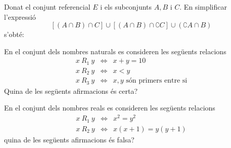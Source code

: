 \begin{enumerate}
\pregunta Donat el conjunt referencial $E$ i els subconjunts $A,B$ i $C$. En
simplificar l'expressió%
\begin{equation*}
\left[ (A\cap B)\cap C\right] \cup\left[ (A\cap B)\cap\complement C\right]
\cup\left( \complement A\cap B\right)
\end{equation*}
s'obté:

\begin{enumerate}
\end{enumerate}
\feedback

\pregunta En el conjunt dels nombres naturals es consideren les següents
relacions%
\begin{equation*}
\begin{array}{lll}
x~R_{1}~y & \Longleftrightarrow & x+y=10 \\
x~R_{2}~y & \Longleftrightarrow & x<y \\
x~R_{3}~y & \Longleftrightarrow & x,y\text{ són primers entre si}%
\end{array}%
\end{equation*}
Quina de les següents afirmacions és certa?

\begin{enumerate}
\end{enumerate}
\feedback

\pregunta En el conjunt dels nombres reals es consideren les següents
relacions%
\begin{equation*}
\begin{array}{lll}
x~R_{1}~y & \Longleftrightarrow & x^{2}=y^{2} \\
x~R_{2}~y & \Longleftrightarrow & x(x+1)=y(y+1)%
\end{array}%
\end{equation*}
quina de les següents afirmacions és falsa?

\begin{enumerate}
\end{enumerate}
\feedback


\end{enumerate}
